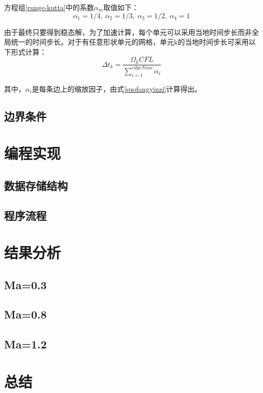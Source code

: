 \documentclass[UTF8]{ctexart}
\begin{document}
\indent 方程组\eqref{runge-kutta}中的系数$\alpha_m$取值如下：
\[	\alpha_1=1/4,\ \alpha_2=1/3,\ \alpha_3=1/2,\ \alpha_4=1 \]

\indent 由于最终只要得到稳态解，为了加速计算，每个单元可以采用当地时间步长而非全局统一的时间步长。对于有任意形状单元的网格，单元k的当地时间步长可采用以下形式计算：
\begin{equation}\label{local_timestep}
\Delta t_k=\frac{\Omega_k CFL}{\sum_{i=1}^{edgeNum}\alpha_i}
\end{equation}

\indent 其中，$\alpha_i$是每条边上的缩放因子，由式\eqref{suofangyinzi}计算得出。

\subsection{边界条件}

\section{编程实现}

\subsection{数据存储结构}

\subsection{程序流程}

\section{结果分析}

\subsection{Ma=0.3}

\subsection{Ma=0.8}

\subsection{Ma=1.2}

\section{总结}
\end{document}

